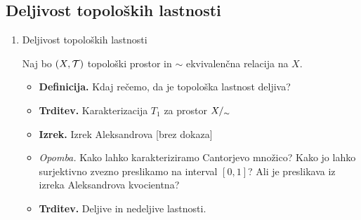 \subsection{Deljivost topoloških lastnosti}
\begin{enumerate}
    \item Deljivost topoloških lastnosti
    
    Naj bo \((X, \mathcal{T})\) topološki prostor in \(\sim\) ekvivalenčna relacija na \(X\).
    \begin{itemize}
        \item \colorbox{purple!30}{\textbf{Definicija.}} Kdaj rečemo, da je topološka lastnost deljiva?
        \item \colorbox{blue!30}{\textbf{Trditev.}} Karakterizacija \(T_1\) za prostor \({X/_\sim}\)
        \item \colorbox{blue!30}{\textbf{Izrek.}} Izrek Aleksandrova [brez dokaza]
        \item \colorbox{yellow!30}{\emph{Opomba.}} Kako lahko karakteriziramo Cantorjevo množico? Kako jo lahko surjektivno zvezno preslikamo na interval \([0,1]\)? Ali je preslikava iz izreka Aleksandrova kvocientna?
        \item \colorbox{blue!30}{\textbf{Trditev.}} Deljive in nedeljive lastnosti. 
    \end{itemize}
\end{enumerate}